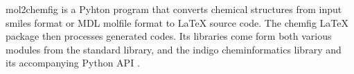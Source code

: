 mol2chemfig is a Pyhton program that converts chemical structures from input smiles format or MDL molfile format to LaTeX source code. The chemfig LaTeX package then processes generated codes. Its libraries come form both various modules from the standard library, and the indigo cheminformatics library and its accompanying Python API \cite{Brefo_Mensah_2012}. 